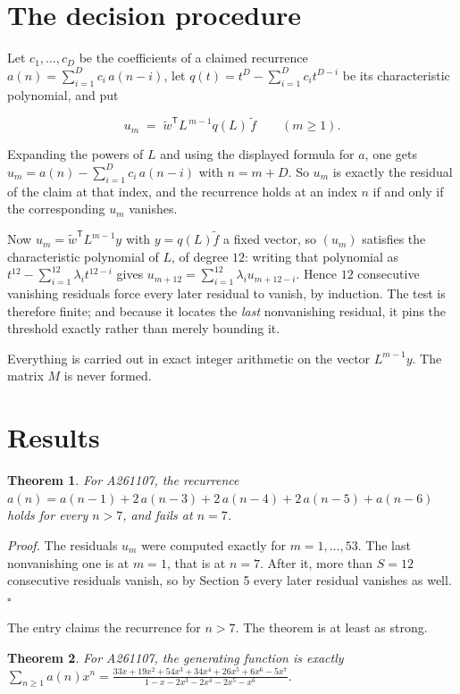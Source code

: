 \documentclass[11pt]{article}
\newtheorem{theorem}{Theorem}
\theoremstyle{definition}
\begin{document}
\section{The decision procedure}

Let $c_1,\dots,c_D$ be the coefficients of a claimed recurrence $a(n) = \sum_{i=1}^{D} c_i\,a(n-i)$, let $q(t) = t^{D} - \sum_{i=1}^{D} c_i t^{D-i}$ be its characteristic polynomial, and put

\[u_m \;=\; \tilde w^{\mathsf T} L^{\,m-1} q(L)\,\tilde f \qquad (m \ge 1).\]

Expanding the powers of $L$ and using the displayed formula for $a$, one gets $u_m = a(n) - \sum_{i=1}^{D} c_i\,a(n-i)$ with $n = m + D$. So $u_m$ is exactly the residual of the claim at that index, and the recurrence holds at an index $n$ if and only if the corresponding $u_m$ vanishes.

Now $u_m = \tilde w^{\mathsf T} L^{m-1} y$ with $y = q(L)\tilde f$ a fixed vector, so $(u_m)$ satisfies the characteristic polynomial of $L$, of degree $12$: writing that polynomial as $t^{12} - \sum_{i=1}^{12} \lambda_i t^{12-i}$ gives $u_{m+12} = \sum_{i=1}^{12} \lambda_i u_{m+12-i}$. Hence $12$ consecutive vanishing residuals force every later residual to vanish, by induction. The test is therefore finite; and because it locates the {\itshape last} nonvanishing residual, it pins the threshold exactly rather than merely bounding it.

Everything is carried out in exact integer arithmetic on the vector $L^{m-1}y$. The matrix $M$ is never formed.

\section{Results}

\begin{theorem} For A261107, the recurrence $a(n) = a(n-1) + 2\,a(n-3) + 2\,a(n-4) + 2\,a(n-5) + a(n-6)$ holds for every $n > 7$, and fails at $n = 7$.\end{theorem}

{\itshape Proof.} The residuals $u_m$ were computed exactly for $m = 1,\dots,53$. The last nonvanishing one is at $m = 1$, that is at $n = 7$. After it, more than $S = 12$ consecutive residuals vanish, so by Section 5 every later residual vanishes as well. $\square$

The entry claims the recurrence for $n > 7$. The theorem is at least as strong.

\begin{theorem} For A261107, the generating function is exactly $\sum_{n\ge 1} a(n)x^n = \frac{33x + 19x^{2} + 54x^{3} + 34x^{4} + 26x^{5} + 6x^{6} - 5x^{7}}{1 - x - 2x^{3} - 2x^{4} - 2x^{5} - x^{6}}$.\end{theorem}
\end{document}
